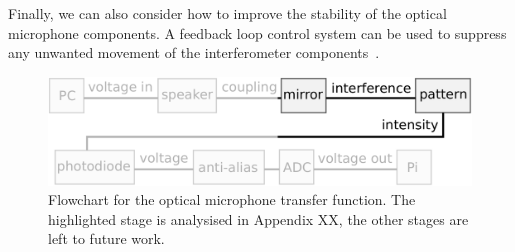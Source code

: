 \documentclass[paper-main.tex]{subfiles}
\begin{document}
Finally, we can also consider how to improve the stability of the optical microphone components.
A feedback loop control system can be used to suppress any unwanted movement of the interferometer components~\citep{abbott2017exploring, Sekiguchi:2016bmv, verhoeven2009robust}. 



\begin{figure}
	\includegraphics[width=.99\textwidth]{figures/pipeline_highlighted.pdf}
	\caption{
Flowchart for the optical microphone transfer function. 
The highlighted stage is analysised in Appendix XX, the other stages are left to future work. 
}
	\label{fig:pipeline_highlighted}
\end{figure}
\end{document}
